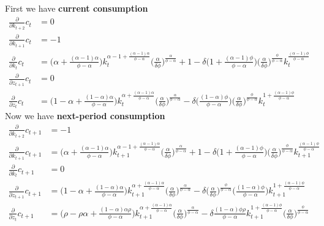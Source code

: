 \documentclass[a4paper]{article}
\theoremstyle{definition}
\begin{document}
First we have \textbf{current consumption}
	\begin{align*}
	\frac{\partial}{\partial k_{t+2}}c_t 	&= 0 \\
	\frac{\partial}{\partial k_{t+1}}c_t 	&= -1 \\
	\frac{\partial}{\partial k_{t}}c_t 		&=  \Big( \alpha+\frac{(\alpha-1)\alpha}{\phi-\alpha} \Big)k_t^{\alpha -1 + \frac{(\alpha-1)\alpha}{\phi-\alpha}}\Big( \frac{\alpha}{\delta\phi} \Big)^{\frac{\alpha}{\phi-\alpha}} + 1 - \delta \Big( 1+\frac{(\alpha-1)\phi}{\phi-\alpha} \Big) \Big( \frac{\alpha}{\delta\phi} \Big)^{\frac{\phi}{\phi-\alpha}} k_t^{\frac{(\alpha-1)\phi}{\phi-\alpha}} \\
	\frac{\partial}{\partial z_{t+1}}c_t 	&= 0\\
	\frac{\partial}{\partial z_{t}}c_t 		&= \Big( 1-\alpha+\frac{(1-\alpha)\alpha}{\phi-\alpha} \Big)k_t^{\alpha + \frac{(\alpha-1)\alpha}{\phi-\alpha}}\Big( \frac{\alpha}{\delta\phi} \Big)^{\frac{\alpha}{\phi-\alpha}} - \delta \Big(\frac{(1-\alpha)\phi}{\phi-\alpha}\Big) \Big( \frac{\alpha}{\delta\phi} \Big)^{\frac{\phi}{\phi-\alpha}}k_t^{1+\frac{(\alpha-1)\phi}{\phi-\alpha}}
	\end{align*}
Now we have \textbf{next-period consumption}
	\begin{align*}
	\frac{\partial}{\partial k_{t+2}}c_{t+1} 	&= -1 \\
	\frac{\partial}{\partial k_{t+1}}c_{t+1} 	&= \Big( \alpha+\frac{(\alpha-1)\alpha}{\phi-\alpha} \Big)k_{t+1}^{\alpha -1 + \frac{(\alpha-1)\alpha}{\phi-\alpha}}\Big( \frac{\alpha}{\delta\phi} \Big)^{\frac{\alpha}{\phi-\alpha}} + 1 - \delta \Big( 1+\frac{(\alpha-1)\phi}{\phi-\alpha} \Big) \Big( \frac{\alpha}{\delta\phi} \Big)^{\frac{\phi}{\phi-\alpha}} k_{t+1}^{\frac{(\alpha-1)\phi}{\phi-\alpha}}\\
	\frac{\partial}{\partial k_{t}}c_{t+1} 	&= 0\\
	\frac{\partial}{\partial z_{t+1}}c_{t+1}	&= \Big( 1-\alpha+\frac{(1-\alpha)\alpha}{\phi-\alpha} \Big) k_{t+1}^{\alpha+\frac{(\alpha-1)\alpha}{\phi-\alpha}} \Big( \frac{\alpha}{\delta\phi} \Big)^{\frac{\alpha}{\phi-\alpha}} - \delta \Big( \frac{\alpha}{\delta\phi} \Big)^{\frac{\phi}{\phi-\alpha}}\Big( \frac{(1-\alpha)\phi}{\phi-\alpha} \Big) k_{t+1}^{1+\frac{(\alpha-1)\phi}{\phi-\alpha}}\\
	\frac{\partial}{\partial z_{t}}c_{t+1}		&= \Big( \rho-\rho\alpha+	\frac{(1-\alpha)\alpha\rho}{\phi-\alpha} \Big) k_{t+1}^{\alpha+\frac{(\alpha-1)\alpha}{\phi-\alpha}} \Big( \frac{\alpha}{\delta\phi} \Big)^{\frac{\alpha}{\phi-\alpha}} - \delta \frac{(1-\alpha)\phi\rho}{\phi-\alpha} k_{t+1}^{1+\frac{(\alpha-1)\phi}{\phi-\alpha}}\Big( \frac{\alpha}{\delta\phi} \Big)^{\frac{\phi}{\phi-\alpha}}
	\end{align*}
\end{document}
